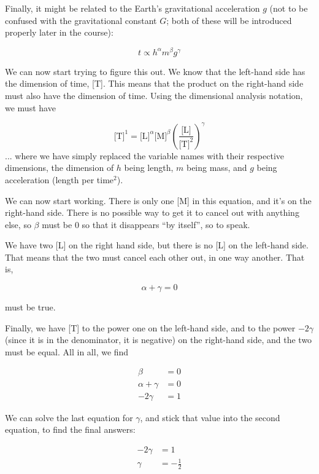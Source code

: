 \documentclass[12pt,a4paper]{report}
\begin{document}
Finally, it might be related to the Earth's gravitational acceleration $g$ (not to be confused with the gravitational constant $G$; both of these will be introduced properly later in the course):

\begin{equation}
t \propto h^\alpha m^\beta g^\gamma
\end{equation}

We can now start trying to figure this out. We know that the left-hand side has the dimension of time, [T]. This means that the product on the right-hand side must also have the dimension of time. Using the dimensional analysis notation, we must have

\begin{equation}
 \text{[T]}^1 = \text{[L]}^\alpha \text{[M]}^\beta \left( \frac{\text{[L]}}{\text{[T]}^2} \right)^\gamma 
 \end{equation}
 ... where we have simply replaced the variable names with their respective dimensions, the dimension of $h$ being length, $m$ being mass, and $g$ being acceleration (length per time${}^2$).
 
 We can now start working. There is only one [M] in this equation, and it's on the right-hand side. There is no possible way to get it to cancel out with anything else, so $\beta$ must be 0 so that it disappears ``by itself'', so to speak.
 
 We have two [L] on the right hand side, but there is no [L] on the left-hand side. That means that the two must cancel each other out, in one way another. That is,
 
\begin{equation*}
 \alpha + \gamma = 0
\end{equation*}

must be true.

Finally, we have [T] to the power one on the left-hand side, and to the power $-2\gamma$ (since it is in the denominator, it is negative) on the right-hand side, and the two must be equal. All in all, we find

\begin{align*}
\beta &= 0\\
\alpha + \gamma &= 0\\
-2\gamma &= 1
\end{align*}

We can solve the last equation for $\gamma$, and stick that value into the second equation, to find the final answers:

\begin{align*}
-2\gamma &= 1\\
\gamma &= -\frac{1}{2}
\end{align*}
\end{document}
